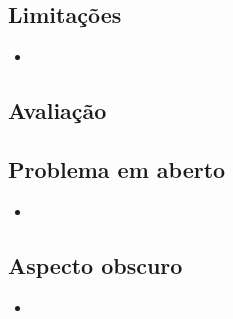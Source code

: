 \subsection{Limitações} %
\begin{itemize}
  \item 
\end{itemize} 


\subsection{Avaliação}

\subsection{Problema em aberto}
 \begin{itemize}
   \item 
 \end{itemize}  

\subsection{Aspecto obscuro}
 \begin{itemize}
   \item
 \end{itemize}  